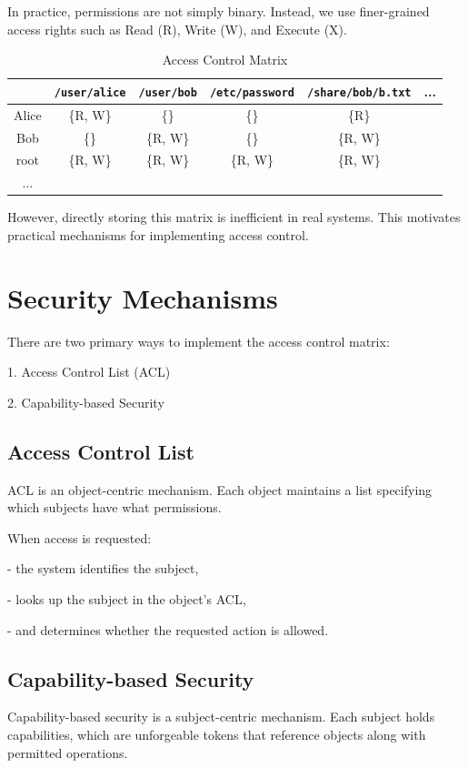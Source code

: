 In practice, permissions are not simply binary. Instead, we use finer-grained access rights such as Read (R), Write (W), and Execute (X).

\begin{table}[H]
  \centering
  \begin{tabular}{c|c|c|c|c|c}
      \toprule
       & \texttt{/user/alice} & \texttt{/user/bob} & \texttt{/etc/password} & \texttt{/share/bob/b.txt} & ... \\
    \midrule
      Alice & \{R, W\} & \{\} & \{\} & \{R\} &   \\
    \midrule
      Bob & \{\} & \{R, W\} & \{\} & \{R, W\} &   \\
    \midrule
      root & \{R, W\} & \{R, W\} & \{R, W\} & \{R, W\} &   \\
    \midrule
      ... &  &  &  &  &   \\
      \bottomrule
  \end{tabular}
  \caption{Access Control Matrix}
\end{table}

However, directly storing this matrix is inefficient in real systems. This motivates practical mechanisms for implementing access control.

\section{Security Mechanisms}

There are two primary ways to implement the access control matrix:

1. Access Control List (ACL)

2. Capability-based Security

\subsection{Access Control List}
ACL is an object-centric mechanism. Each object maintains a list specifying which subjects have what permissions.

When access is requested:

- the system identifies the subject,

- looks up the subject in the object's ACL,

- and determines whether the requested action is allowed.

\subsection{Capability-based Security}
Capability-based security is a subject-centric mechanism. Each subject holds capabilities, which are unforgeable tokens that reference objects along with permitted operations.

